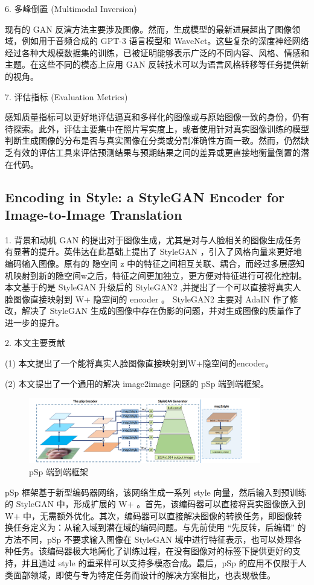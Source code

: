 6. 多峰倒置 (Multimodal Inversion)

现有的 GAN 反演方法主要涉及图像。然而，生成模型的最新进展超出了图像领域，例如用于音频合成的 GPT-3 语言模型和 WaveNet。这些复杂的深度神经网络经过各种大规模数据集的训练，已被证明能够表示广泛的不同内容、风格、情感和主题。在这些不同的模态上应用 GAN 反转技术可以为语言风格转移等任务提供新的视角。

7. 评估指标 (Evaluation Metrics)

感知质量指标可以更好地评估逼真和多样化的图像或与原始图像一致的身份，仍有待探索。此外，评估主要集中在照片写实度上，或者使用针对真实图像训练的模型判断生成图像的分布是否与真实图像在分类或分割准确性方面一致。然而，仍然缺乏有效的评估工具来评估预测结果与预期结果之间的差异或更直接地衡量倒置的潜在代码。

\subsection{Encoding in Style: a StyleGAN Encoder for Image-to-Image Translation}

1. 背景和动机
GAN 的提出对于图像生成，尤其是对与人脸相关的图像生成任务有显著的提升。英伟达在此基础上提出了 StyleGAN ，引入了风格向量来更好地编码输入图像。原有的   隐空间 z 中的特征之间相互关联、耦合，而经过多层感知机映射到新的隐空间w之后，特征之间更加独立，更方便对特征进行可视化控制。
本文基于的是 StyleGAN 升级后的 StyleGAN2 ,并提出了一个可以直接将真实人脸图像直接映射到 W+ 隐空间的 encoder 。 StyleGAN2 主要对 AdaIN 作了修改，解决了 StyleGAN 生成的图像中存在伪影的问题，并对生成图像的质量作了进一步的提升。

2. 本文主要贡献

(1) 本文提出了一个能将真实人脸图像直接映射到W+隐空间的encoder。

(2) 本文提出了一个通用的解决 image2image 问题的 pSp 端到端框架。

\begin{figure}[htb]
\centering 
\includegraphics[width=0.9\textwidth]{img/m2t23.png} 
\caption{pSp 端到端框架}
\label{Test}
\end{figure}

pSp 框架基于新型编码器网络，该网络生成一系列 style 向量，然后输入到预训练的 StyleGAN 中，形成扩展的 W+ 。首先，该编码器可以直接将真实图像嵌入到 W+ 中，无需额外优化。其次，编码器可以直接解决图像的转换任务，即图像转换任务定义为：从输入域到潜在域的编码问题。与先前使用 “先反转，后编辑” 的方法不同，pSp 不要求输入图像在 StyleGAN 域中进行特征表示，也可以处理各种任务。该编码器极大地简化了训练过程，在没有图像对的标签下提供更好的支持，并且通过 style 的重采样可以支持多模态合成。最后，pSp 的应用不仅限于人类面部领域，即使与专为特定任务而设计的解决方案相比，也表现极佳。

